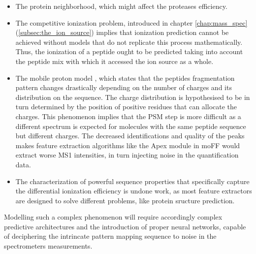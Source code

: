 \begin{itemize}

\item The protein neighborhood, which might affect the protease\textquotesingle s efficiency.

\item The competitive ionization problem, introduced in chapter \ref{chap:mass_spec} (\ref{subsec:the_ion_source}) implies that ionization prediction cannot be achieved without models that do not replicate this process mathematically. Thus, the ionization of a peptide ought to be predicted taking into account the peptide mix with which it accessed the ion source as a whole.


\item The mobile proton model \cite{Boyd2010}, which states that the peptide\textquotesingle s fragmentation pattern changes drastically depending on the number of charges and its distribution on the sequence. The charge distribution is hypothesised to be in turn determined by the position of positive residues that can allocate the charges. This phenomenon implies that the \ac{PSM} step is more difficult as a different spectrum is expected for molecules with the same peptide sequence but different charges. The decreased identifications and quality of the peaks makes feature extraction algorithms like the Apex module in moFF would extract worse \ac{MS1} intensities, in turn injecting noise in the quantification data.

\item The characterization of powerful sequence properties that specifically capture the differential ionization efficiency is undone work, as most feature extractors are designed to solve different problems, like protein sructure prediction.

\end{itemize}

Modelling such a complex phenomenon will require accordingly complex predictive architectures and the introduction of proper neural networks, capable of deciphering the intrincate pattern mapping sequence to noise in the spectrometer\textquotesingle s measurements.


